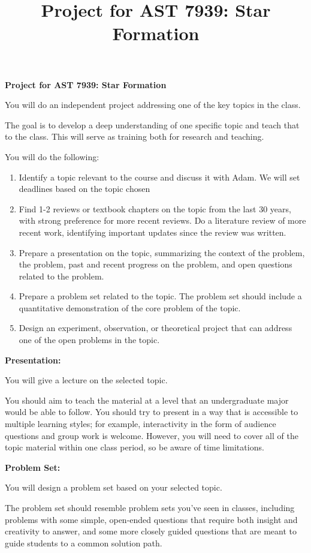 \documentclass{article}
\begin{document}
\title{Project for AST 7939: Star Formation}
\noindent \textbf{\large Project for AST 7939: Star Formation}

You will do an independent project addressing one of the key topics in the
class.

The goal is to develop a deep understanding of one specific topic
and teach that to the class.
This will serve as training both for research and teaching.

You will do the following:
\begin{enumerate}
    \item Identify a topic relevant to the course and discuss it with Adam.
        We will set deadlines based on the topic chosen
    \item Find 1-2 reviews or textbook chapters on the topic from the last 30
        years, with strong preference for more recent reviews.  Do a literature
        review of more recent work, identifying important updates since the review
        was written.
    \item Prepare a presentation on the topic, summarizing the context of the
        problem, the problem, past and recent progress on the problem, and open
        questions related to the problem.
    \item Prepare a problem set related to the topic.  The problem set should
        include a quantitative demonstration of the core problem of the topic.
    \item Design an experiment, observation, or theoretical project that can
        address one of the open problems in the topic.  
\end{enumerate}



\noindent \textbf{Presentation:}

You will give a lecture on the selected topic. 

You should aim to teach the material at a level that an undergraduate major
would be able to follow.  You should try to present in a way that is accessible
to multiple learning styles; for example, interactivity in the form of audience
questions and group work is welcome.  However, you will need to cover all of
the topic material within one class period, so be aware of time limitations.


\noindent \textbf{Problem Set:}

You will design a problem set based on your selected topic.

The problem set should resemble problem sets you've seen in classes, including
problems with some simple, open-ended questions that require both insight and
creativity to answer, and some more closely guided questions that are meant to
guide students to a common solution path.
\end{document}
